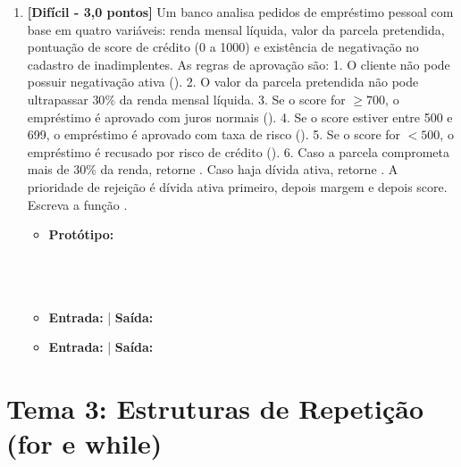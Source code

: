 \begin{enumerate}[label=\textbf{Q\arabic*.}, start=11]


\vspace{0.4cm}

\item \textbf{[Difícil - 3,0 pontos]} Um banco analisa pedidos de empréstimo pessoal com base em quatro variáveis: renda mensal líquida, valor da parcela pretendida, pontuação de score de crédito (0 a 1000) e existência de negativação no cadastro de inadimplentes.
As regras de aprovação são:
1. O cliente não pode possuir negativação ativa ().
2. O valor da parcela pretendida não pode ultrapassar $30\%$ da renda mensal líquida.
3. Se o score for $\ge 700$, o empréstimo é aprovado com juros normais ().
4. Se o score estiver entre 500 e 699, o empréstimo é aprovado com taxa de risco ().
5. Se o score for $< 500$, o empréstimo é recusado por risco de crédito ().
6. Caso a parcela comprometa mais de 30\% da renda, retorne . Caso haja dívida ativa, retorne . A prioridade de rejeição é dívida ativa primeiro, depois margem e depois score.
Escreva a função .

\begin{itemize}[leftmargin=*]
    \item \textbf{Protótipo:}\newline {}\\\\\\\\
    \item \textbf{Entrada:}  | \textbf{Saída:} 
    \item \textbf{Entrada:}  | \textbf{Saída:} 
\end{itemize}



\vspace{0.4cm}

\end{enumerate}


\section*{Tema 3: Estruturas de Repetição (for e while)}

